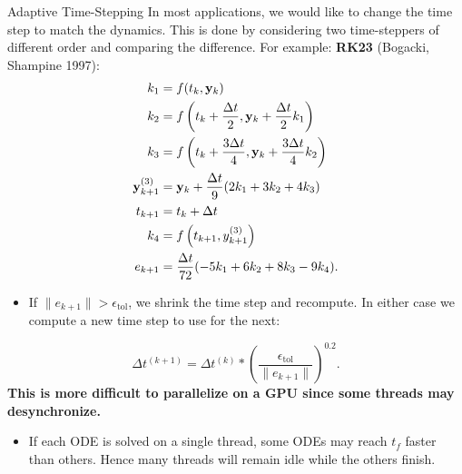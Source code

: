 \begin{frame}{Adaptive Time-Stepping}
In most applications, we would like to change the time step to match the dynamics. This is done by considering two time-steppers of different order and comparing the difference. For example: \textbf{RK23} (Bogacki, Shampine 1997):
\small{
\begin{align*}
    k_1 &= f(t_k, \mathbf{y}_k) \\
    k_2 &= f\left(t_k + \frac{\Delta t}{2}, \mathbf{y}_k + \frac{\Delta t}{2}k_1\right) \\
    k_3 &= f\left(t_k + \frac{3\Delta t}{4}, \mathbf{y}_k + \frac{3\Delta t}{4}k_2\right) \\
    \mathbf{y}_{k+1}^{(3)} &= \mathbf{y}_k + \frac{\Delta t}{9}(2k_1 + 3k_2 + 4k_3) \\
    t_{k+1} &= t_k + \Delta t \\
    k_4 &= f\left(t_{k+1}, y_{k+1}^{(3)}\right) \\
    e_{k+1} &= \frac{\Delta t}{72}(-5k_1 + 6k_2 + 8k_3 - 9k_4).
\end{align*}}
\end{frame}
\begin{frame}
\begin{itemize}
    \item If $\|e_{k+1}\| > \epsilon_{\mathrm{tol}}$, we shrink the time step and recompute. In either case we compute a new time step to use for the next:
\end{itemize}
$$\Delta t^{(k+1)} = \Delta t^{(k)} * \left(\frac{\epsilon_{\mathrm{tol}}}{\|e_{k+1}\|}\right)^{0.2}.$$
\textbf{This is more difficult to parallelize on a GPU since some threads may desynchronize.}
\begin{itemize}
    \item If each ODE is solved on a single thread, some ODEs may reach $t_f$ faster than others. Hence many threads will remain idle while the others finish.
\end{itemize}
\end{frame}
